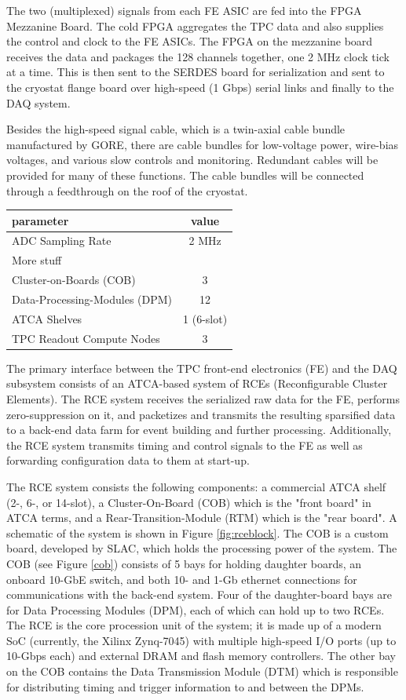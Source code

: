 The two (multiplexed) signals from each FE ASIC are fed into the FPGA Mezzanine Board.  The cold FPGA aggregates the TPC data and also supplies the control and clock to the FE ASICs.   The FPGA on the mezzanine board receives the data and packages the 128 channels together, one 2 MHz clock tick at a time.  This is then sent to the SERDES board for serialization and sent to the cryostat flange board over high-speed (1 Gbps) serial links and finally to the DAQ system.  

Besides the high-speed signal cable, which is a twin-axial cable bundle manufactured by GORE, there are cable bundles for low-voltage power, wire-bias voltages, and various slow controls and monitoring. Redundant cables will be provided for many of these functions. The  cable bundles will be connected through a feedthrough on the roof of the cryostat. 


\begin{tabular}{l|c}
\hline
 parameter & value \\
  \hline
 ADC Sampling Rate & 2 MHz\\
More stuff   & \\
 Cluster-on-Boards (COB) & 3\\
Data-Processing-Modules (DPM) & 12 \\
ATCA Shelves  & 1 (6-slot)\\
TPC Readout Compute Nodes & 3 \\
\hline
\end{tabular}



The primary interface between the TPC front-end electronics (FE) and the DAQ subsystem consists of an ATCA-based system of RCEs (Reconfigurable Cluster Elements).  The RCE system receives the serialized raw data for the FE, performs zero-suppression on it, and packetizes and transmits the resulting sparsified data to a back-end data farm for event building and further processing.  Additionally, the RCE system transmits timing and control signals to the FE as well as forwarding configuration data to them at start-up.     

The RCE system consists the following components:  a commercial ATCA shelf (2-, 6-, or 14-slot), a Cluster-On-Board (COB) which is the "front board" in ATCA terms, and a Rear-Transition-Module (RTM) which is the "rear board". A schematic of the system is shown in Figure \ref{fig:rceblock}.  The COB is a custom board, developed by SLAC, which holds the processing power of the system.  The COB (see Figure \ref{cob}) consists of 5 bays for holding daughter boards, an onboard 10-GbE switch, and both 10- and 1-Gb ethernet connections for communications with the back-end system.  Four of the daughter-board bays are for Data Processing Modules (DPM), each of which can hold up to two RCEs.  The RCE is the core procession unit of the system; it is made up of a modern SoC (currently, the Xilinx Zynq-7045) with multiple high-speed I/O ports (up to 10-Gbps each) and external DRAM and flash memory controllers.  The other bay on the COB contains the Data Transmission Module (DTM) which is responsible  for distributing timing and trigger information to and between the DPMs.  

